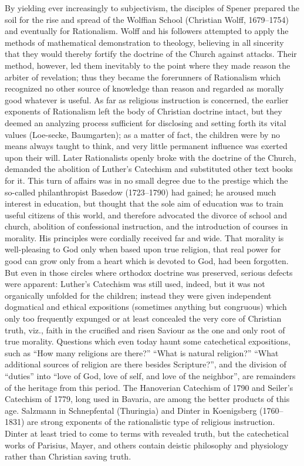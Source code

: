 By yielding ever increasingly to subjectivism, the disciples of Spener prepared the soil for the rise and spread of the Wolffian School (Christian Wolff, 1679–1754) and eventually for Rationalism. Wolff and his followers attempted to apply the methods of mathematical demonstration to theology, believing in all sincerity that they would thereby fortify the doctrine of the Church against attacks. Their method, however, led them inevitably to the point where they made reason the arbiter of revelation; thus they became the forerunners of Rationalism which recognized no other source of knowledge than reason and regarded as morally good whatever
is useful. As far as religious instruction is concerned, the earlier exponents of Rationalism left the body of Christian doctrine intact, but they deemed an analyzing process sufficient for disclosing and setting forth its vital values (Loe-secke, Baumgarten); as a matter of fact, the children were by no means always taught to think, and very little permanent influence was exerted upon their will. Later Rationalists openly broke with the doctrine of the Church, demanded the abolition of Luther’s Catechism and substituted other text books for it. This turn of affairs was in no small degree due to the prestige which the so-called philanthropist Basedow (1723–1790) had gained; he aroused much interest in education, but thought that the sole aim of education was to train useful citizens of this world, and therefore advocated the divorce of school and church, abolition of confessional instruction, and the introduction of courses in morality. His principles were cordially received far and wide. That morality is well-pleasing to God only when based upon true religion, that real power for good can grow only from a heart which is devoted to God, had been forgotten. But even in those circles where orthodox doctrine was preserved, serious defects were apparent: Luther’s Catechism was still used, indeed, but it was not organically unfolded for the children; instead they were given independent dogmatical and ethical expositions (sometimes anything but congruous) which only too frequently expunged or at least concealed the very core of Christian truth, viz., faith in the crucified and risen Saviour as the one and only root of true morality. Questions which even today haunt some catechetical expositions, such as “How many religions are there?” “What is natural religion?” “What additional sources of religion are there besides Scripture?”, and the division of “duties” into “love of God, love of self, and love of the neighbor”, are remainders of the heritage from this period. The Hanoverian Catechism of
1790 and Seiler’s Catechism of 1779, long used in Bavaria, are among the better products of this age. Salzmann in Schnepfental (Thuringia) and Dinter in Koenigsberg (1760–1831) are strong exponents of the rationalistic type of religious instruction. Dinter at least tried to come to terms with revealed truth, but the catechetical works of Parisius, Mayer, and others contain deistic philosophy and physiology rather than Christian saving truth.

